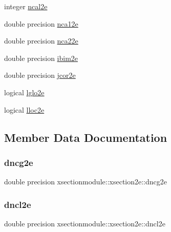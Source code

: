 \begin{DoxyCompactItemize}
\item 
integer \hyperlink{structxsectionmodule_1_1xsection2e_a0a010b4062459602f5a5de5a542c83e5}{ncal2e}
\item 
double precision \hyperlink{structxsectionmodule_1_1xsection2e_a889ed837ecf782647f819311a9b588c8}{nca12e}
\item 
double precision \hyperlink{structxsectionmodule_1_1xsection2e_a3933d855830776be5c58d89ea5cd2d6f}{nca22e}
\item 
double precision \hyperlink{structxsectionmodule_1_1xsection2e_a6e251fbf9cb9dd731b7a1c08b9225afe}{ibim2e}
\item 
double precision \hyperlink{structxsectionmodule_1_1xsection2e_ab045cff8c11e36a3cd082acc72e0e944}{jcor2e}
\item 
logical \hyperlink{structxsectionmodule_1_1xsection2e_afbdddcb86ec62acfce3932d3f2f2f6ec}{lglo2e}
\item 
logical \hyperlink{structxsectionmodule_1_1xsection2e_a325de7e4610bbbb8d1cc6da3d1dbcbc9}{lloc2e}
\end{DoxyCompactItemize}


\subsection{Member Data Documentation}
\mbox{\label{structxsectionmodule_1_1xsection2e_a8d6077bb1576febe82ce67d81d5676c5}} 
\subsubsection{\texorpdfstring{dncg2e}{dncg2e}}
{\footnotesize\ttfamily double precision xsectionmodule\+::xsection2e\+::dncg2e}

\mbox{\label{structxsectionmodule_1_1xsection2e_adbb9e7db96c45b19ca9de2ae0d792db8}} 
\subsubsection{\texorpdfstring{dncl2e}{dncl2e}}
{\footnotesize\ttfamily double precision xsectionmodule\+::xsection2e\+::dncl2e}

